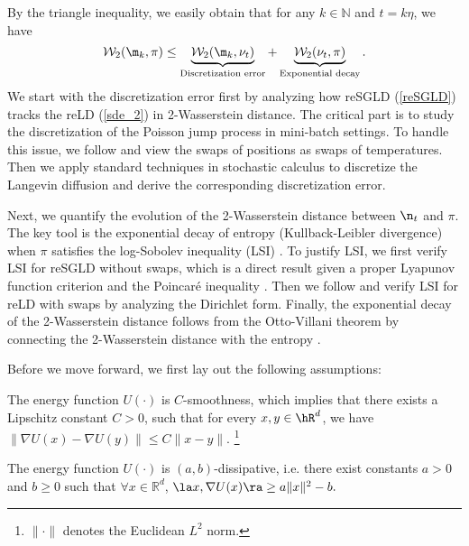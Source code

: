 By the triangle inequality, we easily obtain that for any $k\in \mathbb{N}$ and $t=k\eta$, we have 
\begin{equation*}
    \mathcal{W}_2(\m_k, \pi)\le \underbrace{\mathcal{W}_2(\m_k, \nu_{t})}_{\text{Discretization error}} +\underbrace{\mathcal{W}_2(\nu_{t}, \pi)}_{\text{Exponential decay}}.
\end{equation*}
We start with the discretization error first by analyzing how reSGLD (\ref{reSGLD}) tracks the reLD (\ref{sde_2}) in 2-Wasserstein distance. The critical part is to study the discretization of the Poisson jump process in mini-batch settings. To handle this issue, we follow \citet{Paul12} and view the swaps of positions as swaps of temperatures. Then we apply standard techniques in stochastic calculus \citep{chen2018accelerating, yin_zhu_10, Issei14, Maxim17} to discretize the Langevin diffusion and derive the corresponding discretization error.


Next, we quantify the evolution of the 2-Wasserstein distance between $\n_t$ and $\pi$. The key tool is the exponential decay of entropy (Kullback-Leibler divergence) when $\pi$ satisfies the log-Sobolev inequality (LSI) \citep{Bakry2014}. To justify LSI, we first verify LSI for reSGLD without swaps, which is a direct result given a proper Lyapunov function criterion \citep{Cattiaux2010} and the Poincar\'{e} inequality \citep{chen2018accelerating}. Then we follow \citet{chen2018accelerating} and verify LSI for reLD with swaps by analyzing the Dirichlet form. Finally, the exponential decay of the 2-Wasserstein distance follows from the Otto-Villani theorem by connecting the 2-Wasserstein distance with the entropy \citep{Bakry2014}. 


Before we move forward, we first lay out the following assumptions:
\begin{assumption}[Smoothness]\label{assump: lip and alpha beta}
The energy function $U(\cdot)$ is $C$-smoothness, which implies that there exists a Lipschitz constant $C>0$, such that for every $x,y\in\hR^d$, we have $\|\nabla U(x)-\nabla U(y)\|\le C\|x-y\|.$ \footnote{$\|\cdot\|$ denotes the Euclidean $L^2$ norm.}
\end{assumption}{}


\begin{assumption}[Dissipativity]\label{assump: dissipitive}
The energy function $U(\cdot)$ is $(a,b)$-dissipative, i.e. there exist constants $a>0$ and $b\ge 0$ such that $\forall x\in\mathbb R^d$,  $\la x,\nabla U(x)\ra \ge a\|x\|^2-b.$
\end{assumption}{}

